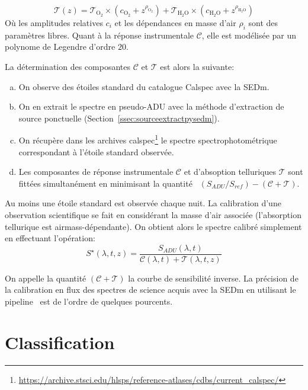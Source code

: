 \documentclass[../main/main.tex]{subfiles}
\begin{document}
\begin{equation}
  \label{eq:telluricpysedm}
  \mathcal{T}(z) =
  \mathcal{T}_{\text{O}_{2}}\times(c_{\text{O}_{2}}+z^{\rho_{\text{O}_{2}}})
  + \mathcal{T}_{\text{H}_{2}\text{O}}\times(c_{\text{H}_{2}\text{O}}+z^{\rho_{\text{H}_{2}\text{O}}})
\end{equation}
Où les amplitudes relatives $c_{i}$ et les dépendances en masse d'air
$\rho_{i}$ sont des paramètres libres. Quant à la réponse instrumentale
$\mathcal{C}$, elle est modélisée par un polynome de Legendre d'ordre $20$.

La détermination des composantes $\mathcal{C}$ et $\mathcal{T}$ est alors la suivante:

\begin{enumerate}[(a)]
  \itemsep=0em
\item On observe des étoiles standard du catalogue Calspec
  \citep{Bohlinstdcalpsec} avec la SEDm.
\item On en extrait le spectre en pseudo-ADU avec la méthode
  d'extraction de source ponctuelle
  (Section~\ref{ssec:sourceextractpysedm}).
\item On récupère dans les archives calspec\footnote{\url{https://archive.stsci.edu/hlsps/reference-atlases/cdbs/current_calspec/}} le spectre
  spectrophotométrique correspondant à l'étoile standard observée.
\item Les composantes de réponse instrumentale $\mathcal{C}$ et
  d'absoption telluriques $\mathcal{T}$ sont fittées simultanément en
  minimisant la quantité ~$(S_{ADU}/S_{ref}) - (\mathcal{C} + \mathcal{T})$.
\end{enumerate}

Au moins une étoile standard est observée chaque nuit. La calibration
d'une observation scientifique se fait en considérant la masse d'air
associée (l'absorption tellurique est airmass-dépendante). On obtient
alors le spectre calibré simplement en effectuant l'opération:
\begin{equation*}
  S^{\star}(\lambda,t,z)=\frac{S_{ADU}(\lambda,t)}{\mathcal{C}(\lambda,t)+\mathcal{T}(\lambda,t,z)}
\end{equation*}

On appelle la quantité $(\mathcal{C} + \mathcal{T})$ la courbe de
sensibilité inverse.
La précision de la calibration en flux des spectres de science acquis
avec la SEDm en utilisant le pipeline \pysedm\ est de l'ordre de quelques pourcents.

\section{Classification}
\end{document}
